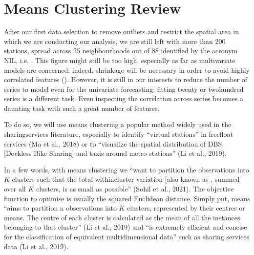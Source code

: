 \documentclass[letterpaper,10pt,english]{jupyterBook}
\begin{document}
\section{\sphinxhyphen{}Means Clustering Review}
\label{\detokenize{04-stations_kmeans:k-means-clustering-review}}
\sphinxAtStartPar
After our first data selection to remove outliers and restrict the spatial area in which we are conducting our analysis,
we are still left with more than 200 stations, spread across 25 neighbourhoods out of 88 \sphinxhyphen{} identified by the acronym NIL, i.e. . This figure might still be too high, especially as far as multivariate models are concerned: indeed, shrinkage will be necessary in order to avoid highly correlated features ().
However, it is still in our interests to reduce the number of series to model even for the univariate forecasting: fitting twenty or two\sphinxhyphen{}hundred series is a different task. Even inspecting the correlation across series becomes a daunting task with such a great number of features.

\sphinxAtStartPar
To do so, we will use \sphinxhyphen{}means clustering \sphinxhyphen{} a popular method widely used in the sharing\sphinxhyphen{}services literature, especially to identify “virtual stations” in free\sphinxhyphen{}float services (Ma et al., 2018) or to “visualize the spatial distribution of DBS {[}Dockless Bike Sharing{]} and taxis around metro stations” (Li et al., 2019).

\sphinxAtStartPar
In a few words, with \sphinxhyphen{}means clustering  we “want to partition the observations into \(K\) clusters such that the total within\sphinxhyphen{}cluster variation {[}also known as  \sphinxstyleemphasis{inertia}{]}, summed over all \(K\) clusters, is as small as possible” (Sohil et al., 2021). The objective function to optimise is usually the squared Euclidean distance. Simply put, \sphinxhyphen{}means “aims to partition n observations into \(K\) clusters, represented by their centres or means. The centre of each cluster is calculated as the mean of all the instances belonging to that cluster” (Li et al., 2019) and “is extremely efficient and concise for the classification of equivalent multidimensional data” such as sharing services data (Li et al., 2019).
\end{document}
